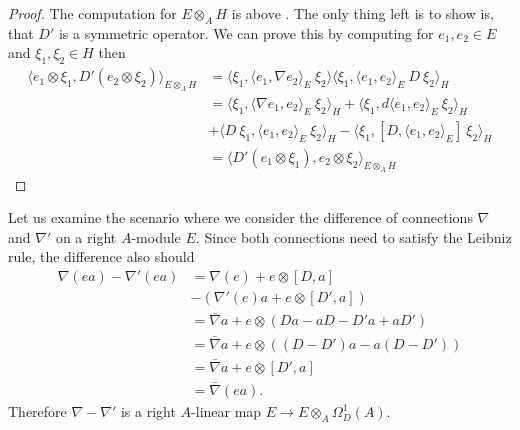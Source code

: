 \begin{proof}
    The computation for $E\otimes _A H$ is above . The only thing left is to
    show is, that $D'$ is a symmetric operator. We can prove this by
    computing for $e_1, e_2 \in E$ and $\xi _1, \xi _2 \in H$ then
    \begin{align}
        \langle e_1 \otimes \xi _1, D'(e_2 \otimes \xi_2)\rangle _{E\otimes _A H} &=
        \langle \xi _1, \langle e_1, \nabla e_2\rangle _E\ \xi _2\rangle
        \langle \xi _1 , \langle e_1, e_2\rangle _E\ D\ \xi_2\rangle_H  \nonumber\\
        &= \langle \xi _1, \langle \nabla e_1, e_2\rangle _E\ \xi _2\rangle _H + \langle \xi _1, d\langle e_1, e_2\rangle  _E
        \ \xi _2\rangle _H \nonumber\\
        &+ \langle D\ \xi _1,\langle e_1, e_2\rangle _E\ \xi _2\rangle _H -
        \langle \xi _1, [D, \langle e_1, e_2\rangle _E]\ \xi
        _2 \rangle _H \nonumber\\
        &= \langle D'(e_1 \otimes \xi _1), e_2 \otimes \xi _2\rangle _{E \otimes _A H}
    \end{align}
\end{proof}

Let us examine the scenario where we consider the difference of connections $\nabla$ and
$\nabla'$ on a right $A$-module $E$. Since both connections need to satisfy
the Leibniz rule, the difference also should
    \begin{align}
        \nabla(ea)-\nabla'(ea)&=\nabla(e) + e\otimes[D, a]\nonumber\\
        &-(\nabla'(e)a + e\otimes[D',a])\nonumber\\
        &=\bar{\nabla}a + e\otimes(Da-aD-D'a+aD')\nonumber\\
        &=\bar{\nabla}a + e\otimes((D-D')a-a(D-D'))\nonumber\\
        &=\bar{\nabla}a + e\otimes[D', a]\nonumber\\
        &=\bar{\nabla}(ea).
    \end{align}
Therefore $\nabla-\nabla'$ is a right $A$-linear map
$E \rightarrow E\otimes _A \Omega _D^1(A)$.

